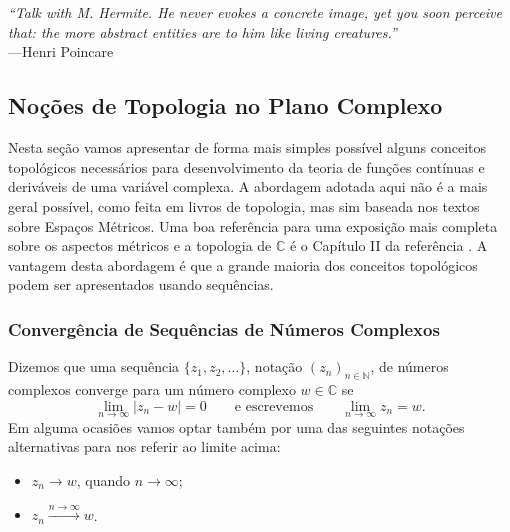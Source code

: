 \chapter[Semana 2]{}
\chaptermark{}


\hfill%
\begin{minipage}{14cm}
\begin{flushright}
\rightskip=0.5cm
\textit{``Talk with M. Hermite. He never evokes a concrete image, yet you soon perceive that: the more abstract entities are to him like living creatures.''}
\\[0.1cm]
\rightskip=0.5cm
---Henri Poincare
\end{flushright}
\end{minipage}

\section{Noções de Topologia no Plano Complexo}\label{sec-nocoes-top}

Nesta seção vamos apresentar de forma mais simples possível alguns conceitos topológicos necessários 
para desenvolvimento da teoria de funções contínuas e deriváveis de uma variável complexa.
A abordagem adotada aqui não é a mais geral possível, como feita em livros de topologia, mas sim 
baseada nos textos sobre Espaços Métricos. Uma boa referência para uma exposição mais completa 
sobre os aspectos métricos e a topologia de $\mathbb{C}$ é o Capítulo II da referência 
\cite{MR503901}. A vantagem desta abordagem é que a grande maioria dos conceitos topológicos
podem ser apresentados usando sequências. 

\subsection{Convergência de Sequências de Números Complexos}

Dizemos que uma sequência $\{z_1,z_2,\ldots\}$, notação $(z_n)_{n\in\mathbb{N}}$, 
de números complexos converge para um número complexo 
$w\in\mathbb{C}$ se 
\[
\lim_{n\to\infty} |z_n-w| = 0 \qquad\text{e escrevemos}\qquad \lim_{n\to\infty}z_n = w.
\]
Em alguma ocasiões vamos optar também por uma das seguintes notações alternativas 
para nos referir ao limite acima: 
\begin{itemize}
	\item $z_n\to w$, quando $n\to\infty$;
	\item $z_n\xrightarrow{n\to\infty}w$.
\end{itemize}

